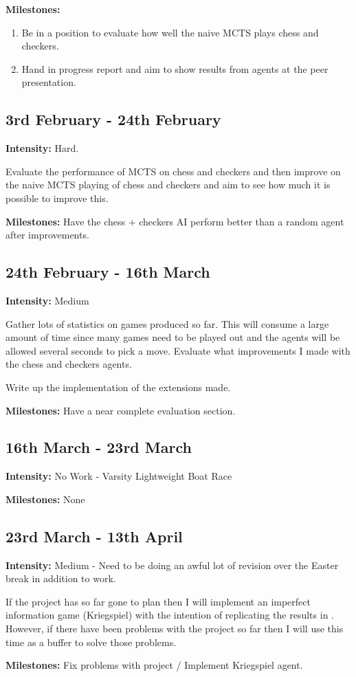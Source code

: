 \documentclass[12pt]{article}
\begin{document}
{\bf Milestones:} \begin{enumerate}
\item Be in a position to evaluate how well the naive MCTS plays chess and checkers.
\item Hand in progress report and aim to show results from agents at the peer presentation.
\end{enumerate}


\subsection*{3rd February - 24th February}
{\bf Intensity:} Hard.\par
Evaluate the performance of MCTS on chess and checkers and then
improve on the naive MCTS playing of chess and checkers and aim to see how much it is possible to improve this.\par
{\bf Milestones:} Have the chess + checkers AI perform better than a random agent after improvements.




\subsection*{24th February - 16th March}
{\bf Intensity:} Medium\par
Gather lots of statistics on games produced so far. This will consume a large amount of time since many games need to be played out and the agents will be allowed several seconds to pick a move.
Evaluate what improvements I made with the chess and checkers agents.\par
Write up the implementation of the extensions made.\par
{\bf Milestones:} Have a near complete evaluation section.




\subsection*{16th March - 23rd March}
{\bf Intensity:} No Work - Varsity Lightweight Boat Race\par
{\bf Milestones:} None

\subsection*{23rd March - 13th April}
{\bf Intensity:} Medium - Need to be doing an awful lot of revision over the Easter break in addition to work.\par
If the project has so far gone to plan then I will implement an imperfect information game (Kriegspiel) with the intention of replicating the results in \cite{war}. However, if there have been problems with the project so far then I will use this time as a buffer to solve those problems. \par
{\bf Milestones:} Fix problems with project / Implement Kriegspiel agent.
\end{document}
